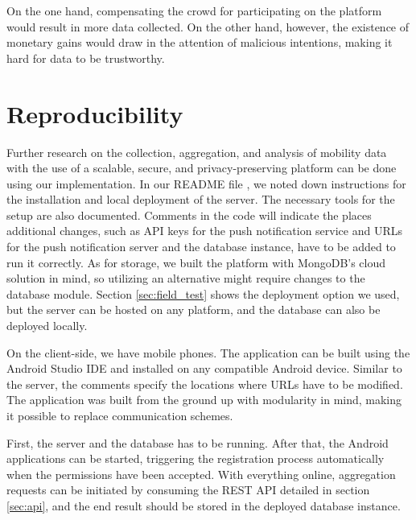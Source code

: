On the one hand, compensating the crowd for participating on the platform would result in more data collected. On the other hand, however, the existence of monetary gains would draw in the attention of malicious intentions, making it hard for data to be trustworthy.

\section{Reproducibility}
Further research on the collection, aggregation, and analysis of mobility data with the use of a scalable, secure, and privacy-preserving platform can be done using our implementation. In our README file \cite{readme}, we noted down instructions for the installation and local deployment of the server. The necessary tools for the setup are also documented. Comments in the code will indicate the places additional changes, such as API keys for the push notification service and URLs for the push notification server and the database instance, have to be added to run it correctly. As for storage, we built the platform with MongoDB's cloud solution in mind, so utilizing an alternative might require changes to the database module. Section \ref{sec:field_test} shows the deployment option we used, but the server can be hosted on any platform, and the database can also be deployed locally.

On the client-side, we have mobile phones. The application can be built using the Android Studio IDE and installed on any compatible Android device. Similar to the server, the comments specify the locations where URLs have to be modified. The application was built from the ground up with modularity in mind, making it possible to replace communication schemes.

First, the server and the database has to be running. After that, the Android applications can be started, triggering the registration process automatically when the permissions have been accepted. With everything online, aggregation requests can be initiated by consuming the REST API detailed in section \ref{sec:api}, and the end result should be stored in the deployed database instance.